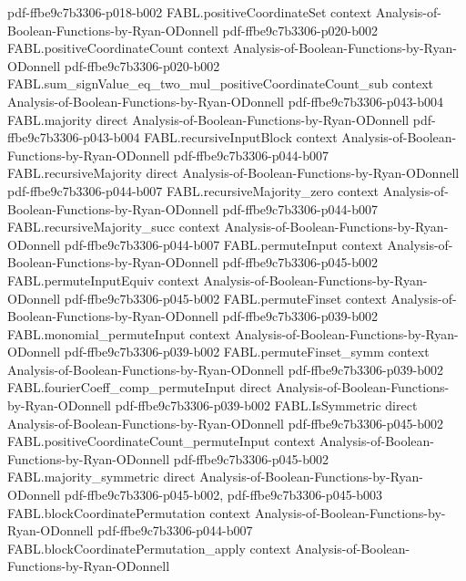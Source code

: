 \begin{theorem}
  {pdf-ffbe9c7b3306-p018-b002}
\proofstep
  {FABL.positiveCoordinateSet}
  {context}
  {Analysis-of-Boolean-Functions-by-Ryan-ODonnell}
  {pdf-ffbe9c7b3306-p020-b002}
\proofstep
  {FABL.positiveCoordinateCount}
  {context}
  {Analysis-of-Boolean-Functions-by-Ryan-ODonnell}
  {pdf-ffbe9c7b3306-p020-b002}
\proofstep
  {FABL.sum_signValue_eq_two_mul_positiveCoordinateCount_sub}
  {context}
  {Analysis-of-Boolean-Functions-by-Ryan-ODonnell}
  {pdf-ffbe9c7b3306-p043-b004}
\proofstep
  {FABL.majority}
  {direct}
  {Analysis-of-Boolean-Functions-by-Ryan-ODonnell}
  {pdf-ffbe9c7b3306-p043-b004}
\proofstep
  {FABL.recursiveInputBlock}
  {context}
  {Analysis-of-Boolean-Functions-by-Ryan-ODonnell}
  {pdf-ffbe9c7b3306-p044-b007}
\proofstep
  {FABL.recursiveMajority}
  {direct}
  {Analysis-of-Boolean-Functions-by-Ryan-ODonnell}
  {pdf-ffbe9c7b3306-p044-b007}
\proofstep
  {FABL.recursiveMajority_zero}
  {context}
  {Analysis-of-Boolean-Functions-by-Ryan-ODonnell}
  {pdf-ffbe9c7b3306-p044-b007}
\proofstep
  {FABL.recursiveMajority_succ}
  {context}
  {Analysis-of-Boolean-Functions-by-Ryan-ODonnell}
  {pdf-ffbe9c7b3306-p044-b007}
\proofstep
  {FABL.permuteInput}
  {context}
  {Analysis-of-Boolean-Functions-by-Ryan-ODonnell}
  {pdf-ffbe9c7b3306-p045-b002}
\proofstep
  {FABL.permuteInputEquiv}
  {context}
  {Analysis-of-Boolean-Functions-by-Ryan-ODonnell}
  {pdf-ffbe9c7b3306-p045-b002}
\proofstep
  {FABL.permuteFinset}
  {context}
  {Analysis-of-Boolean-Functions-by-Ryan-ODonnell}
  {pdf-ffbe9c7b3306-p039-b002}
\proofstep
  {FABL.monomial_permuteInput}
  {context}
  {Analysis-of-Boolean-Functions-by-Ryan-ODonnell}
  {pdf-ffbe9c7b3306-p039-b002}
\proofstep
  {FABL.permuteFinset_symm}
  {context}
  {Analysis-of-Boolean-Functions-by-Ryan-ODonnell}
  {pdf-ffbe9c7b3306-p039-b002}
\proofstep
  {FABL.fourierCoeff_comp_permuteInput}
  {direct}
  {Analysis-of-Boolean-Functions-by-Ryan-ODonnell}
  {pdf-ffbe9c7b3306-p039-b002}
\proofstep
  {FABL.IsSymmetric}
  {direct}
  {Analysis-of-Boolean-Functions-by-Ryan-ODonnell}
  {pdf-ffbe9c7b3306-p045-b002}
\proofstep
  {FABL.positiveCoordinateCount_permuteInput}
  {context}
  {Analysis-of-Boolean-Functions-by-Ryan-ODonnell}
  {pdf-ffbe9c7b3306-p045-b002}
\proofstep
  {FABL.majority_symmetric}
  {direct}
  {Analysis-of-Boolean-Functions-by-Ryan-ODonnell}
  {pdf-ffbe9c7b3306-p045-b002,
    pdf-ffbe9c7b3306-p045-b003}
\proofstep
  {FABL.blockCoordinatePermutation}
  {context}
  {Analysis-of-Boolean-Functions-by-Ryan-ODonnell}
  {pdf-ffbe9c7b3306-p044-b007}
\proofstep
  {FABL.blockCoordinatePermutation_apply}
  {context}
  {Analysis-of-Boolean-Functions-by-Ryan-ODonnell}

\end{theorem}
